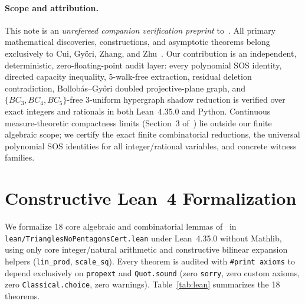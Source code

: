 \documentclass[10pt,twocolumn]{article}
\begin{document}
\paragraph{Scope and attribution.}
This note is an \emph{unrefereed companion verification preprint} to~\cite{CuiGyoriZhangZhu2026}. All primary mathematical discoveries, constructions, and asymptotic theorems belong exclusively to Cui, Gy\H{o}ri, Zhang, and Zhu~\cite{CuiGyoriZhangZhu2026}. Our contribution is an independent, deterministic, zero-floating-point audit layer: every polynomial SOS identity, directed capacity inequality, 5-walk-free extraction, residual deletion contradiction, Bollob\'as--Gy\H{o}ri doubled projective-plane graph, and $\{BC_3, BC_4, BC_5\}$-free 3-uniform hypergraph shadow reduction is verified over exact integers and rationals in both Lean~4.35.0 and Python. Continuous measure-theoretic compactness limits (Section~3 of~\cite{CuiGyoriZhangZhu2026}) lie outside our finite algebraic scope; we certify the exact finite combinatorial reductions, the universal polynomial SOS identities for all integer/rational variables, and concrete witness families.

\section{Constructive Lean~4 Formalization}
We formalize 18 core algebraic and combinatorial lemmas of~\cite{CuiGyoriZhangZhu2026} in \nolinkurl{lean/TrianglesNoPentagonsCert.lean} under Lean~4.35.0 without Mathlib, using only core integer/natural arithmetic and constructive bilinear expansion helpers (\texttt{lin\_prod}, \texttt{scale\_sq}). Every theorem is audited with \texttt{\#print axioms} to depend exclusively on \texttt{propext} and \texttt{Quot.sound} (zero \texttt{sorry}, zero custom axioms, zero \texttt{Classical.choice}, zero warnings). Table~\ref{tab:lean} summarizes the 18 theorems.
\end{document}
